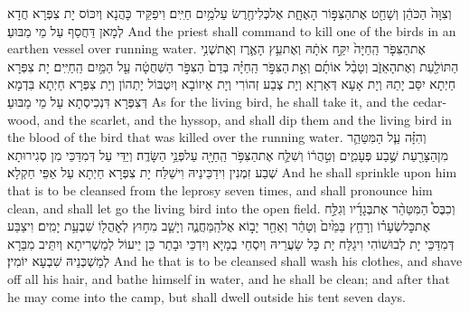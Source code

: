 {וְצִוָּה֙ הַכֹּהֵ֔ן וְשָׁחַ֖ט אֶת\maqqaf הַצִּפּ֣וֹר הָאֶחָ֑ת אֶל\maqqaf כְּלִי\maqqaf חֶ֖רֶשׂ עַל\maqqaf מַ֥יִם חַיִּֽים׃}
{וִיפַקֵּיד כָּהֲנָא וְיִכּוֹס יָת צִפְּרָא חֲדָא לְמָאן דַּחֲסַף עַל מֵי מַבּוּעַ׃}
{And the priest shall command to kill one of the birds in an earthen vessel over running water.}{}
{אֶת\maqqaf הַצִּפֹּ֤ר הַֽחַיָּה֙ יִקַּ֣ח אֹתָ֔הּ וְאֶת\maqqaf עֵ֥ץ הָאֶ֛רֶז וְאֶת\maqqaf שְׁנִ֥י הַתּוֹלַ֖עַת וְאֶת\maqqaf הָאֵזֹ֑ב וְטָבַ֨ל אוֹתָ֜ם וְאֵ֣ת \legarmeh  הַצִּפֹּ֣ר הַֽחַיָּ֗ה בְּדַם֙ הַצִּפֹּ֣ר הַשְּׁחֻטָ֔ה עַ֖ל הַמַּ֥יִם הַֽחַיִּֽים׃}
{יָת צִפְּרָא חַיְתָא יִסַּב יָתַהּ וְיָת אָעָא דְּאַרְזָא וְיָת צְבַע זְהוֹרִי וְיָת אֵיזוֹבָא וְיִטְבּוֹל יָתְהוֹן וְיָת צִפְּרָא חַיְתָא בִּדְמָא דְּצִפְּרָא דִּנְכִיסְתָא עַל מֵי מַבּוּעַ׃}
{As for the living bird, he shall take it, and the cedar-wood, and the scarlet, and the hyssop, and shall dip them and the living bird in the blood of the bird that was killed over the running water.}{}
{וְהִזָּ֗ה עַ֧ל הַמִּטַּהֵ֛ר מִן\maqqaf הַצָּרַ֖עַת שֶׁ֣בַע פְּעָמִ֑ים וְטִ֣הֲר֔וֹ וְשִׁלַּ֛ח אֶת\maqqaf הַצִּפֹּ֥ר הַֽחַיָּ֖ה עַל\maqqaf פְּנֵ֥י הַשָּׂדֶֽה׃}
{וְיַדֵּי עַל דְּמִדַּכֵּי מִן סְגִירוּתָא שְׁבַע זִמְנִין וִידַכֵּינֵיהּ וִישַׁלַּח יָת צִפְּרָא חַיְתָא עַל אַפֵּי חַקְלָא׃}
{And he shall sprinkle upon him that is to be cleansed from the leprosy seven times, and shall pronounce him clean, and shall let go the living bird into the open field.}{}
{וְכִבֶּס֩ הַמִּטַּהֵ֨ר אֶת\maqqaf בְּגָדָ֜יו וְגִלַּ֣ח אֶת\maqqaf כׇּל\maqqaf שְׂעָר֗וֹ וְרָחַ֤ץ בַּמַּ֙יִם֙ וְטָהֵ֔ר וְאַחַ֖ר יָב֣וֹא אֶל\maqqaf הַֽמַּחֲנֶ֑ה וְיָשַׁ֛ב מִח֥וּץ לְאׇהֳל֖וֹ שִׁבְעַ֥ת יָמִֽים׃}
{וִיצַבַּע דְּמִדַּכֵּי יָת לְבוּשׁוֹהִי וִיגַלַּח יָת כָּל שַׂעֲרֵיהּ וְיִסְחֵי בְמַיָּא וְיִדְכֵּי וּבָתַר כֵּן יֵיעוֹל לְמַשְׁרִיתָא וְיִתֵּיב מִבַּרָא לְמַשְׁכְּנֵיהּ שִׁבְעָא יוֹמִין׃}
{And he that is to be cleansed shall wash his clothes, and shave off all his hair, and bathe himself in water, and he shall be clean; and after that he may come into the camp, but shall dwell outside his tent seven days.}{}
